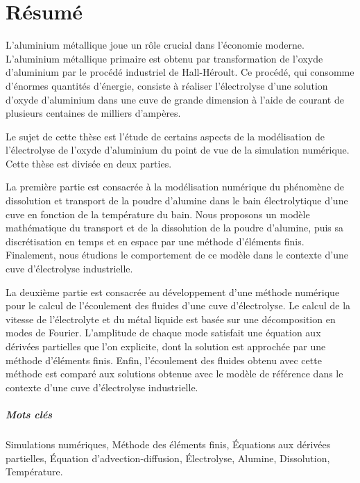 

\chapter*{Résumé}

L'aluminium métallique joue un rôle crucial dans l'économie
moderne. L'aluminium métallique primaire est obtenu par transformation
de l'oxyde d'aluminium par le procédé industriel de Hall-Héroult. Ce
procédé, qui consomme d'énormes quantités d'énergie, consiste à
réaliser l'électrolyse d'une solution d'oxyde d'aluminium dans une
cuve de grande dimension à l'aide de courant de plusieurs centaines de
milliers d'ampères.

Le sujet de cette thèse est l'étude de certains aspects de la
modélisation de l'électrolyse de l'oxyde d'aluminium du point de vue
de la simulation numérique. Cette thèse est divisée en deux parties.

La première partie est consacrée à la modélisation numérique du
phénomène de dissolution et transport de la poudre d'alumine dans le
bain électrolytique d'une cuve en fonction de la température du
bain. Nous proposons un modèle mathématique du transport et de la
dissolution de la poudre d'alumine, puis sa discrétisation en temps et
en espace par une méthode d'éléments finis. Finalement, nous étudions
le comportement de ce modèle dans le contexte d'une cuve d'électrolyse
industrielle.

La deuxième partie est consacrée au développement d'une méthode
numérique pour le calcul de l'écoulement des fluides d'une cuve
d'électrolyse. Le calcul de la vitesse de l'électrolyte et du métal
liquide est basée sur une décomposition en modes de
Fourier. L'amplitude de chaque mode satisfait une équation aux
dérivées partielles que l'on explicite, dont la solution est approchée
par une méthode d'éléments finis. Enfin, l'écoulement des fluides
obtenu avec cette méthode est comparé aux solutions obtenue avec le
modèle de référence dans le contexte d'une cuve d'électrolyse
industrielle.

\paragraph{Mots clés} Simulations numériques, Méthode des
éléments finis, Équations aux dérivées partielles, Équation
d'advection-diffusion, Électrolyse, Alumine, Dissolution, Température.


